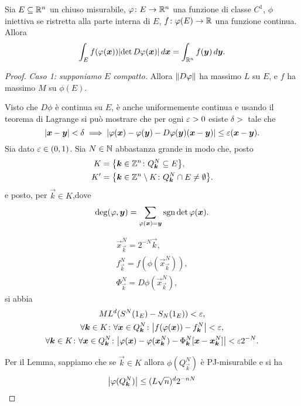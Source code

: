 \begin{theorem}
Sia $E\subseteq {\mathbb R}^n$ un chiuso misurabile, $\varphi\colon E \to {\mathbb R}^n$
una funzione di classe $C^1$, 
$\phi$ iniettiva se ristretta alla parte interna di $E$,
$f\colon \varphi(E)\to {\mathbb R}$ una funzione 
continua. Allora
\[
    \int_E f(\varphi(\boldsymbol x)){\left|\det D \varphi(\boldsymbol x)\right|}\, d \boldsymbol x
    =
    \int_{{\mathbb R}^n} f(\boldsymbol y) \, d \boldsymbol y.
\]
\end{theorem}

\begin{proof}
\emph{Caso 1: supponiamo $E$ compatto.}
Allora ${\left\Vert D\varphi\right\Vert}$ ha massimo $L$ su $E$, e $f$ ha massimo $M$ 
su $\phi(E)$. 

Visto che $D\phi$ è continua su $E$, è anche uniformemente continua e 
usando il teorema di Lagrange si può mostrare che per ogni $\varepsilon>0$ 
esiste $\delta>$ tale che
\[
 {\left|\boldsymbol x - \boldsymbol y\right|}<\delta 
 \implies 
 {\left|\varphi(\boldsymbol x)-\varphi(\boldsymbol y)-D\varphi(\boldsymbol y)(\boldsymbol x - \boldsymbol y)\right|}
 \le \varepsilon (\boldsymbol x - \boldsymbol y).
\]
Sia dato $\varepsilon\in(0,1)$.
Sia $N\in {\mathbb N}$ abbastanza grande in modo che, posto
\begin{align*}
  K&={\left\{ \boldsymbol k\in {\mathbb Z}^n\colon Q^N_{\boldsymbol k}\subseteq E \right\}},\\
  K'&={\left\{ \boldsymbol k\in {\mathbb Z}^n\setminus K \colon Q^N_{\boldsymbol k}\cap E\neq \emptyset \right\}}.
\end{align*}
e posto, per $\vec k \in K$,dove 
\[
  \deg(\varphi,\boldsymbol y) = \sum_{\varphi(\boldsymbol x)=\boldsymbol y} \operatorname{sgn} \det \varphi(\boldsymbol x).
\]

\begin{gather*}
  \vec x^N_{\vec k} = 2^{-N}\vec k,\\
  f^N_{\vec k} = f(\phi(\vec x^N_{\vec k})),\\ 
  \Phi^N_{\vec k} = D\phi(\vec x^N_{\vec k}), 
\end{gather*}
si abbia
\begin{gather*}
  M L^d (S^N(1_E)-S_N(1_E)) < \varepsilon,\\
  \forall \boldsymbol k\in K \colon \forall \boldsymbol x \in Q^N_{\boldsymbol k}\colon
    {\left|f(\varphi(\boldsymbol x))-f^N_{\boldsymbol k}\right|} < \varepsilon,\\
  \forall \boldsymbol k\in K \colon \forall \boldsymbol x \in Q^N_{\boldsymbol k}\colon
    {\left|\varphi(\boldsymbol x) - \varphi(\boldsymbol x^N_{\boldsymbol k})-\Phi^N_{\boldsymbol k}[\boldsymbol x-\boldsymbol x^N_{\boldsymbol k}]\right|} < \varepsilon 2^{-N}.
\end{gather*}

Per il Lemma, sappiamo che se $\vec k \in K$ allora $\phi(Q^N_{\vec k})$ è PJ-misurabile 
e si ha 
\[
 {\left|\varphi(Q^N_{\boldsymbol k})\right|} 
 \le (L\sqrt n)^d 2^{-nN}
\]


\end{proof}
